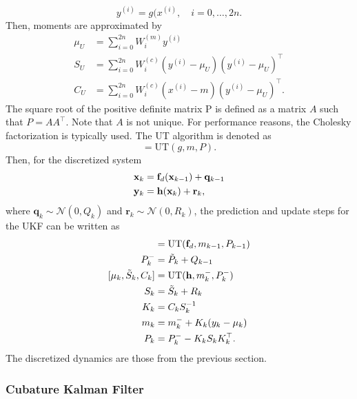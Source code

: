 \documentclass[../zhang_thesis.tex]{subfiles}
\begin{document}
\begin{equation}
    y^{(i)} = g(x^{(i)}, \quad i=0,\dots,2n.
\end{equation}
Then, moments are approximated by
\begin{align}
    \mu_U & = \sum_{i=0}^{2n} W_i^{(m)} y^{(i)} \\
    S_U & = \sum_{i=0}^{2n} W_i^{(c)} ( y^{(i)} - \mu_U ) ( y^{(i)} - \mu_U )^\top \\
    C_U & = \sum_{i=0}^{2n} W_i^{(c)} ( x^{(i)} - m ) ( y^{(i)} - \mu_U )^\top.
\end{align}
The square root of the positive definite matrix P is defined as a matrix $A$ such that $P=AA^\top$. Note that $A$ is not unique. For performance reasons, the Cholesky factorization is typically used. The UT algorithm is denoted as
\begin{equation}
    [\mu_U,S_U,C_U] = \mathrm{UT}(g,m,P).
\end{equation}
Then, for the discretized system
\begin{align}
    \mathbf{x}_k & = \mathbf{f}_d(\mathbf{x}_{k-1}) + \mathbf{q}_{k-1} \\
    \mathbf{y}_k & = \mathbf{h}(\mathbf{x}_k) + \mathbf{r}_k,
\end{align}
where $\mathbf{q}_k\sim\mathcal{N}(0,Q_{k})$ and $\mathbf{r}_k\sim\mathcal{N}(0,R_{k})$, the prediction and update steps for the UKF can be written as
\begin{align}
    [m_k^{-},\tilde{P}_k] & = \mathrm{UT}(\vf_d,m_{k-1},P_{k-1}) \\
    P^{-}_k & = \tilde{P}_k + Q_{k-1} \\
    [\mu_k,\tilde{S}_k,C_k] & = \mathrm{UT}(\mathbf{h},m_k^{-},P^{-}_k) \\
    S_k & = \tilde{S}_k + R_k \\
    K_k & = C_k S_k^{-1} \\
    m_k & = m_k^{-} + K_k (y_k-\mu_k) \\
    P_k & = P^{-}_k - K_k S_k K_k^\top.
\end{align}
The discretized dynamics are those from the previous section.

\subsubsection{Cubature Kalman Filter}
\end{document}
